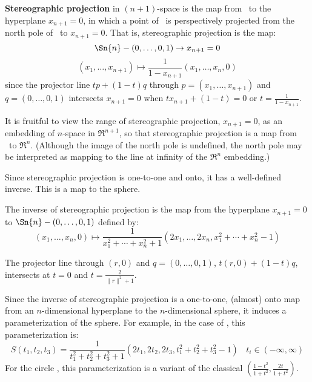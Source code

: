 \begin{defn2}
{\bf Stereographic projection} in $(n+1)$-space is the map from \ 
to the hyperplane $x_{n+1}=0$,
in which a point of \ is perspectively projected from 
the north pole of \Sn{n}\ to $x_{n+1}=0$. %
That is, stereographic projection is the map:
\[ \Sn{n} - (0,\ldots,0,1) \rightarrow x_{n+1}=0 \]
\[ (x_1,\ldots,x_{n+1}) \mapsto \frac{1}{1-x_{n+1}} (x_1,\ldots,x_n,0) \]
since the projector line $tp + (1-t)q$ through $p = (x_1,\ldots,x_{n+1})$ 
and $q = (0,\ldots,0,1)$ intersects $x_{n+1}=0$ 
when $tx_{n+1} + (1-t) = 0$ or $t = \frac{1}{1-x_{n+1}}$.
\end{defn2}

It is fruitful to view the range of stereographic projection, $x_{n+1}=0$, 
as an embedding of $n$-space in $\Re^{n+1}$, so that stereographic projection
is a map from \Sn{n}\ to $\Re^n$.
(Although the image of the north pole is undefined, 
the north pole may be interpreted
as mapping to the line at infinity of the $\Re^n$ embedding.)

Since stereographic projection is one-to-one and onto,
it has a well-defined inverse.
This is a map to the sphere.
%
\begin{lemma}
The inverse of stereographic projection is the map from the hyperplane
$x_{n+1}=0$ to $\Sn{n} - (0,\ldots,0,1)$ defined by:
\[ (x_1,\ldots,x_n,0) \mapsto
	\frac{1}{x_1^2 + \cdots + x_n^2 + 1} 
	(2x_1, \ldots, 2x_n, x_1^2 + \cdots + x_n^2 - 1)
\]	%
\end{lemma}
\prf
The projector line through $(r,0)$ and $q = (0,\ldots,0,1)$, $t(r,0) + (1-t)q$,
intersects \Sn{n} at $t=0$ and $t=\frac{2}{\|r\|^2 + 1}$.
\QED

Since the inverse of stereographic projection is a one-to-one, 
(almost) onto map from an $n$-dimensional
hyperplane to the $n$-dimensional sphere, 
it induces a parameterization of the sphere.
For example, in the case of , this parameterization is:
\begin{equation}
	S(t_1,t_2,t_3) = 
	\frac{1}{t_1^2 + t_2^2 + t_3^2 + 1} 
	(2t_1, 2t_2, 2t_3, t_1^2 + t_2^2 + t_3^2 - 1) \ \ \ \ t_i \in (-\infty,\infty)
\end{equation}
For the circle , this parameterization is a variant of the
classical $(\frac{1-t^2}{1+t^2}, \frac{2t}{1+t^2})$.






